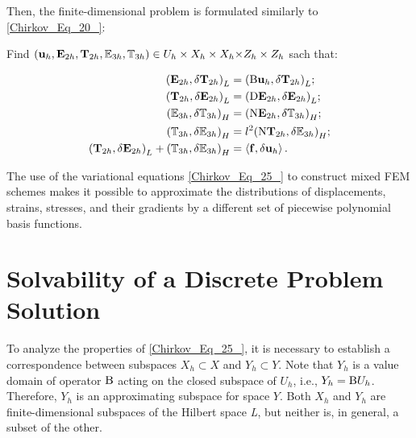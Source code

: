 Then, the finite-dimensional problem is formulated similarly to \eqref{Chirkov_Eq_20_}:

Find $({{\mathbf u}}_h,{{\mathbf E}}_{2h},{{\mathbf T}}_{2h},{{\mathbb E}}_{3h},{{\mathbb T}}_{{\rm 3}h})\in U_h\times X_h\times X_h{\rm \times }Z_h\times Z_h$ sach that: 

\begin{equation} \label{Chirkov_Eq_25_}  
	\begin{aligned}
		{\left({{\mathbf E}}_{2h},\delta {{\mathbf T}}_{2h}\right)}_L&={\left({\rm B}{{\mathbf u}}_h,\delta {{\mathbf T}}_{2h}\right)}_L; 
		\\ 
		{\left({{\mathbf T}}_{2h},\delta {{\mathbf E}}_{2h}\right)}_L&={\left({\rm D}{{\mathbf E}}_{2h},\delta {{\mathbf E}}_{2h}\right)}_L;
		\\ 
		{\left({{\mathbb E}}_{3h},\delta {{\mathbb T}}_{3h}\right)}_H&={\left({{\rm N}{\mathbf E}}_{2h},\delta {{\mathbb T}}_{3h}\right)}_H; 
		\\ 
		{\left({{\mathbb T}}_{3h},\delta {{\mathbb E}}_{3h}\right)}_H&=l^2{\left({{\rm N}{\mathbf T}}_{2h},\delta {{\mathbb E}}_{3h}\right)}_H; 
		\\ 
		{\left({{\mathbf T}}_{2h},\delta {{\mathbf E}}_{2h}\right)}_L+{\left({{\mathbb T}}_{3h},\delta {{\mathbb E}}_{3h}\right)}_H&=\left\langle {\mathbf f},{\delta {\mathbf u}}_h\right\rangle . 
	\end{aligned}
\end{equation}

The use of the variational equations \eqref{Chirkov_Eq_25_} to construct mixed FEM schemes makes it possible to approximate the distributions of displacements, strains, stresses, and their gradients by a different set of piecewise polynomial basis functions.

\section{Solvability of a Discrete Problem Solution} 



To analyze the properties of \eqref{Chirkov_Eq_25_}, it is necessary to establish a correspondence between subspaces $X_h\subset X$ and $Y_h\subset Y$. Note that $Y_h$ is a value domain of operator ${\rm B}$ acting on the closed subspace of $U_h$, i.e., $Y_h={\rm B}U_h$. Therefore, $Y_h$ is an approximating subspace for space $Y$. Both $X_h$ and $Y_h$ are finite-dimensional subspaces of the Hilbert space \textit{L}, but neither is, in general, a subset of the other.

